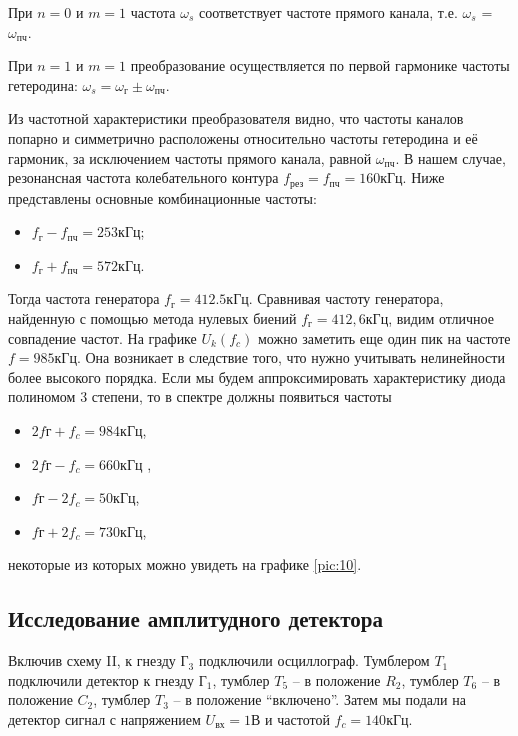 При $n = 0$ и $m = 1$ частота $\omega_s$ соответствует частоте прямого канала, т.е. $\omega_s$ = $\omega _{\text{пч}}$.

При $n = 1$ и $m = 1$ преобразование осуществляется по первой гармонике частоты гетеродина: $\omega_{s} = \omega_{\text{г}} \pm \omega_{\text{пч}}$.

Из частотной характеристики преобразователя видно, что частоты каналов попарно
и симметрично расположены относительно частоты гетеродина и её гармоник, за исключением частоты прямого канала, равной $\omega_{\text{пч}}$. 
В нашем случае, резонансная частота колебательного контура $f_{\text{рез}} = f_{\text{пч}} = 160 \text{кГц}$.
Ниже представлены основные комбинационные частоты:
\begin{itemize}
	
	\item $f_{\text{г}} - f_{\text{пч}} = 253 \text{кГц}$; 

	\item $f_{\text{г}} + f_{\text{пч}} =572 \text{кГц}$. 
\end{itemize}

Тогда частота генератора $f_{\text{г}}= 412.5 \text{кГц}$. Сравнивая частоту генератора, найденную с помощью метода нулевых биений $f_{\text{г}}=412,6 \text{кГц}$, видим отличное совпадение частот.
На графике $U_k(f_c)$ можно заметить еще один пик на частоте $f=985\text{кГц}$. Она возникает в следствие того, что нужно учитывать нелинейности более высокого порядка. Если мы будем аппроксимировать характеристику диода полиномом 3 степени, то в спектре должны появиться частоты 
\begin{itemize}
	
	\item $2f{\text{г}}+f_c=984 \text{кГц}$,
	\item $2f{\text{г}}-f_c=660 \text{кГц}$ , 
	\item $f{\text{г}}-2f_c=50 \text{кГц}$, 
	\item $f{\text{г}}+2f_c=730 \text{кГц}$, 

\end{itemize}
некоторые из которых можно увидеть на графике \ref{pic:10}.

\subsection{Исследование амплитудного детектора}
Включив схему II, к гнезду $\text{Г}_3$ подключили осциллограф. Тумблером $T_1$ подключили детектор к гнезду $\text{Г}_1$, тумблер $T_5$ -- в положение $R_2$, тумблер $T_6$ -- в положение $C_2$, тумблер $T_3$ -- в положение “включено”. Затем мы подали на детектор сигнал с напряжением $U_{\text{вх}} = 1 \text{В}$ и частотой $f_c = 140 \text{кГц}$.

